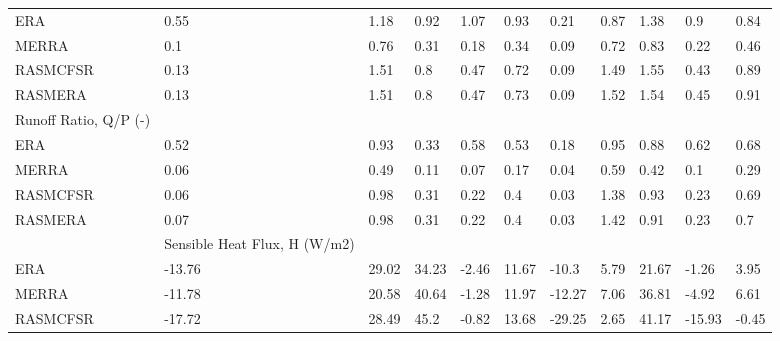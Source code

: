 \begin{table}[]
{\begin{tabular}{lllllllllll}
ERA                                            & 0.55                         & 1.18   & 0.92   & 1.07   & 0.93   & 0.21   & 0.87   & 1.38   & 0.9    & 0.84   \\
MERRA                                          & 0.1                          & 0.76   & 0.31   & 0.18   & 0.34   & 0.09   & 0.72   & 0.83   & 0.22   & 0.46   \\
RASMCFSR                                       & 0.13                         & 1.51   & 0.8    & 0.47   & 0.72   & 0.09   & 1.49   & 1.55   & 0.43   & 0.89   \\
RASMERA                                        & 0.13                         & 1.51   & 0.8    & 0.47   & 0.73   & 0.09   & 1.52   & 1.54   & 0.45   & 0.91   \\
Runoff Ratio, Q/P (-)                          &                              &        &        &        &        &        &        &        &        &        \\
ERA                                            & 0.52                         & 0.93   & 0.33   & 0.58   & 0.53   & 0.18   & 0.95   & 0.88   & 0.62   & 0.68   \\
MERRA                                          & 0.06                         & 0.49   & 0.11   & 0.07   & 0.17   & 0.04   & 0.59   & 0.42   & 0.1    & 0.29   \\
RASMCFSR                                       & 0.06                         & 0.98   & 0.31   & 0.22   & 0.4    & 0.03   & 1.38   & 0.93   & 0.23   & 0.69   \\
RASMERA                                        & 0.07                         & 0.98   & 0.31   & 0.22   & 0.4    & 0.03   & 1.42   & 0.91   & 0.23   & 0.7    \\
                                               & Sensible Heat Flux, H (W/m2) &        &        &        &        &        &        &        &        &        \\
ERA                                            & -13.76                       & 29.02  & 34.23  & -2.46  & 11.67  & -10.3  & 5.79   & 21.67  & -1.26  & 3.95   \\
MERRA                                          & -11.78                       & 20.58  & 40.64  & -1.28  & 11.97  & -12.27 & 7.06   & 36.81  & -4.92  & 6.61   \\
RASMCFSR                                       & -17.72                       & 28.49  & 45.2   & -0.82  & 13.68  & -29.25 & 2.65   & 41.17  & -15.93 & -0.45  \\

\end{tabular}}
\end{table}
